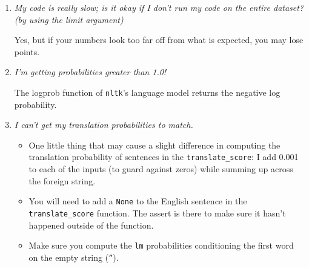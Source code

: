 \documentclass[11pt]{article}
\begin{document}
\begin{enumerate}

\item \textit{My code is really slow; is it okay if I don't run my code on the entire dataset?  (by using the limit argument)}

Yes, but if your numbers look too far off from what is expected, you may lose points.

\item \textit{I'm getting probabilities greater than 1.0!}

The logprob function of \texttt{nltk}'s language model returns the negative log probability.

\item \textit{I can't get my translation probabilities to match.}

\begin{itemize}
\item One little thing that may cause a slight difference in computing
  the translation probability of sentences in the
  \texttt{translate\_score}: I add 0.001 to each of the inputs (to
  guard against zeros) while summing up across the foreign string.

\item You will need to add a \texttt{None} to the English sentence in the \texttt{translate\_score} function.  The assert is there to make sure it hasn't happened outside of the function.
 
\item Make sure you compute the \texttt{lm} probabilities conditioning the
  first word on the empty string (\texttt{''}).
\end{itemize}

\end{enumerate}
\end{document}
